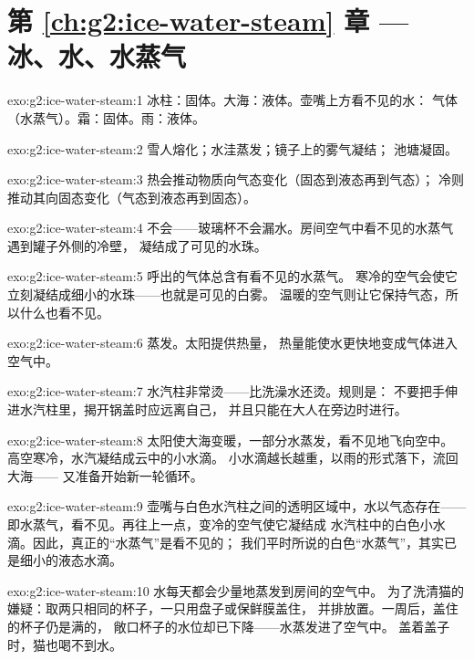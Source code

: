 \section*{第 \ref{ch:g2:ice-water-steam} 章 --- 冰、水、水蒸气}

\begin{solution}{exo:g2:ice-water-steam:1}
冰柱：固体。大海：液体。壶嘴上方看不见的水：
气体（水蒸气）。霜：固体。雨：液体。
\end{solution}

\begin{solution}{exo:g2:ice-water-steam:2}
雪人熔化；水洼蒸发；镜子上的雾气凝结；
池塘凝固。
\end{solution}

\begin{solution}{exo:g2:ice-water-steam:3}
热会推动物质向气态变化（固态到液态再到气态）；
冷则推动其向固态变化（气态到液态再到固态）。
\end{solution}

\begin{solution}{exo:g2:ice-water-steam:4}
不会——玻璃杯不会漏水。房间空气中看不见的水蒸气
遇到罐子外侧的冷壁，
凝结成了可见的水珠。
\end{solution}

\begin{solution}{exo:g2:ice-water-steam:5}
呼出的气体总含有看不见的水蒸气。
寒冷的空气会使它立刻凝结成细小的水珠——也就是可见的白雾。
温暖的空气则让它保持气态，所以什么也看不见。
\end{solution}

\begin{solution}{exo:g2:ice-water-steam:6}
蒸发。太阳提供热量，
热量能使水更快地变成气体进入空气中。
\end{solution}

\begin{solution}{exo:g2:ice-water-steam:7}
水汽柱非常烫——比洗澡水还烫。规则是：
不要把手伸进水汽柱里，揭开锅盖时应远离自己，
并且只能在大人在旁边时进行。
\end{solution}

\begin{solution}{exo:g2:ice-water-steam:8}
太阳使大海变暖，一部分水蒸发，看不见地飞向空中。
高空寒冷，水汽凝结成云中的小水滴。
小水滴越长越重，以雨的形式落下，流回大海——
又准备开始新一轮循环。
\end{solution}

\begin{solution}{exo:g2:ice-water-steam:9}
壶嘴与白色水汽柱之间的透明区域中，水以气态存在——
即水蒸气，看不见。再往上一点，变冷的空气使它凝结成
水汽柱中的白色小水滴。因此，真正的“水蒸气”是看不见的；
我们平时所说的白色“水蒸气”，其实已是细小的液态水滴。
\end{solution}

\begin{solution}{exo:g2:ice-water-steam:10}
水每天都会少量地蒸发到房间的空气中。
为了洗清猫的嫌疑：取两只相同的杯子，一只用盘子或保鲜膜盖住，
并排放置。一周后，盖住的杯子仍是满的，
敞口杯子的水位却已下降——水蒸发进了空气中。
盖着盖子时，猫也喝不到水。
\end{solution}
